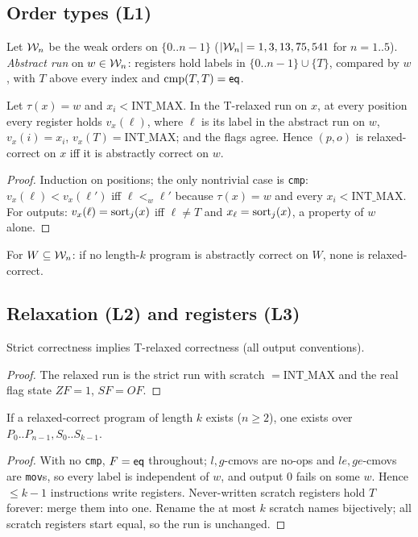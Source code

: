 \subsection{Order types (L1)}
Let $\mathcal{W}_n$ be the weak orders on $\{0..n-1\}$ ($|\mathcal{W}_n|=1,3,13,75,541$ for $n=1..5$).
\emph{Abstract run} on $w\in\mathcal{W}_n$: registers hold labels in $\{0..n-1\}\cup\{T\}$, compared by $w$, with $T$ above every
index and $\mathrm{cmp}(T,T)=\mathsf{eq}$.
\begin{lemma}[L1]
Let $\tau(x)=w$ and $x_i<\mathrm{INT\_MAX}$. In the T-relaxed run on $x$, at every position every register holds
$v_x(\ell)$, where $\ell$ is its label in the abstract run on $w$, $v_x(i)=x_i$, $v_x(T)=\mathrm{INT\_MAX}$; and the
flags agree. Hence $(p,o)$ is relaxed-correct on $x$ iff it is abstractly correct on $w$.
\end{lemma}
\begin{proof}
Induction on positions; the only nontrivial case is \texttt{cmp}: $v_x(\ell)<v_x(\ell')$ iff $\ell<_w\ell'$ because
$\tau(x)=w$ and every $x_i<\mathrm{INT\_MAX}$. For outputs: $v_x(\ell)=\mathrm{sort}_j(x)$ iff $\ell\neq T$ and $x_\ell=\mathrm{sort}_j(x)$,
a property of $w$ alone.
\end{proof}
\begin{corollary}[L1b]
For $W\subseteq\mathcal{W}_n$: if no length-$k$ program is abstractly correct on $W$, none is relaxed-correct.
\end{corollary}

\subsection{Relaxation (L2) and registers (L3)}
\begin{lemma}[L2] Strict correctness implies T-relaxed correctness (all output conventions). \end{lemma}
\begin{proof} The relaxed run is the strict run with scratch $=\mathrm{INT\_MAX}$ and the real flag state $ZF=1$, $SF=OF$. \end{proof}
\begin{lemma}[L3] If a relaxed-correct \RS{} program of length $k$ exists ($n\ge2$), one exists over $P_0..P_{n-1},S_0..S_{k-1}$. \end{lemma}
\begin{proof}
With no \texttt{cmp}, $F=\mathsf{eq}$ throughout; $l,g$-cmovs are no-ops and $le,ge$-cmovs are \texttt{mov}s, so every label is
independent of $w$, and output $0$ fails on some $w$. Hence $\le k-1$ instructions write registers. Never-written scratch
registers hold $T$ forever: merge them into one. Rename the at most $k$ scratch names bijectively; all scratch registers
start equal, so the run is unchanged.
\end{proof}

